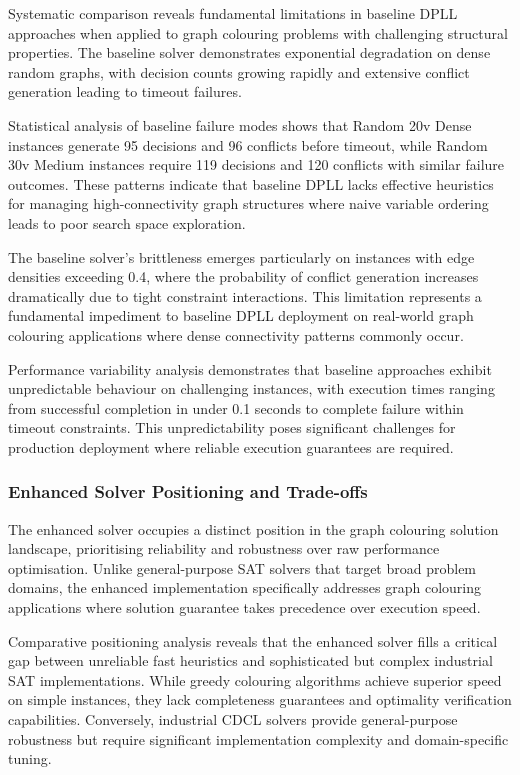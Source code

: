 Systematic comparison reveals fundamental limitations in baseline DPLL approaches when applied to graph colouring problems with challenging structural properties. The baseline solver demonstrates exponential degradation on dense random graphs, with decision counts growing rapidly and extensive conflict generation leading to timeout failures.

Statistical analysis of baseline failure modes shows that Random 20v Dense instances generate 95 decisions and 96 conflicts before timeout, while Random 30v Medium instances require 119 decisions and 120 conflicts with similar failure outcomes. These patterns indicate that baseline DPLL lacks effective heuristics for managing high-connectivity graph structures where naive variable ordering leads to poor search space exploration.

The baseline solver's brittleness emerges particularly on instances with edge densities exceeding 0.4, where the probability of conflict generation increases dramatically due to tight constraint interactions. This limitation represents a fundamental impediment to baseline DPLL deployment on real-world graph colouring applications where dense connectivity patterns commonly occur.

Performance variability analysis demonstrates that baseline approaches exhibit unpredictable behaviour on challenging instances, with execution times ranging from successful completion in under 0.1 seconds to complete failure within timeout constraints. This unpredictability poses significant challenges for production deployment where reliable execution guarantees are required.

\subsubsection{Enhanced Solver Positioning and Trade-offs}

The enhanced solver occupies a distinct position in the graph colouring solution landscape, prioritising reliability and robustness over raw performance optimisation. Unlike general-purpose SAT solvers that target broad problem domains, the enhanced implementation specifically addresses graph colouring applications where solution guarantee takes precedence over execution speed.

Comparative positioning analysis reveals that the enhanced solver fills a critical gap between unreliable fast heuristics and sophisticated but complex industrial SAT implementations. While greedy colouring algorithms achieve superior speed on simple instances, they lack completeness guarantees and optimality verification capabilities. Conversely, industrial CDCL solvers provide general-purpose robustness but require significant implementation complexity and domain-specific tuning.

